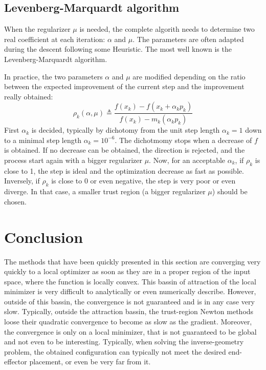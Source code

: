 \documentclass{book}
\begin{document}
\subsection{Levenberg-Marquardt algorithm}
When the regularizer $\mu$ is needed, the complete algorith needs to determine two real coefficient at each iteration: $\alpha$ and $\mu$. The parameters are often adapted during the descent following some Heuristic. The most well known is the Levenberg-Marquardt algorithm.

In practice, the two parameters $\alpha$ and $\mu$ are modified depending on the ratio between the expected improvement of the current step and the improvement really obtained:
\[ \rho_k (\alpha,\mu) \triangleq \frac{ f(x_k) - f(x_k + \alpha_k p_k)}{ f(x_k) - m_k(\alpha_k p_k)} \]
First $\alpha_k$ is decided, typically by dichotomy from the unit step length $\alpha_k=1$ down to a minimal step length $\alpha_k = 10^{-6}$. The dichotmomy stops when a decrease of $f$ is obtained. If no decrease can be obtained, the direction is rejected, and the process start again with a bigger regularizer $\mu$. Now, for an acceptable $\alpha_k$, if $\rho_k$ is close to 1, the step is ideal and the optimization decrease as fast as possible. Inversely, if $\rho_k$ is close to 0 or even negative, the step is very poor or even diverge. In that case, a smaller trust region (\mie a bigger regularizer $\mu$) should be chosen. 

\section{Conclusion}

The methods that have been quickly presented in this section are converging very quickly to a local optimizer as soon as they are in a proper region of the input space, where the function is locally convex. This bassin of attraction of the local minimizer is very difficult to analytically or even numerically describe. However, outside of this bassin, the convergence is not guaranteed and is in any case very slow. Typically, outside the attraction bassin, the trust-region Newton methods loose their quadratic convergence to become as slow as the gradient. Moreover, the convergence is only on a local minimizer, that is not guaranteed to be global and not even to be interesting. Typically, when solving the inverse-geometry problem, the obtained configuration can typically not meet the desired end-effector placement, or even be very far from it.
\end{document}
